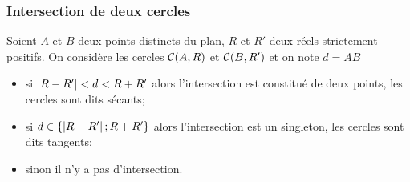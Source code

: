 \subsubsection{Intersection de deux cercles}
\begin{prop}
  Soient $A$ et $B$ deux points distincts du plan, $R$ et $R'$ deux réels strictement positifs. On considère les cercles $\mathcal{C}(A,R)$ et $\mathcal{C}(B,R')$ et on note $d=AB$
  \begin{itemize}
  \item si $\left\lvert R-R'\right\rvert<d<R+R'$ alors l'intersection est constitué de deux points, les cercles sont dits sécants;
  \item si $d \in \{\left\lvert R-R'\right\rvert;R+R'\}$ alors l'intersection est un singleton, les cercles sont dits tangents;
  \item sinon il n'y a pas d'intersection.
  \end{itemize}
\end{prop}
